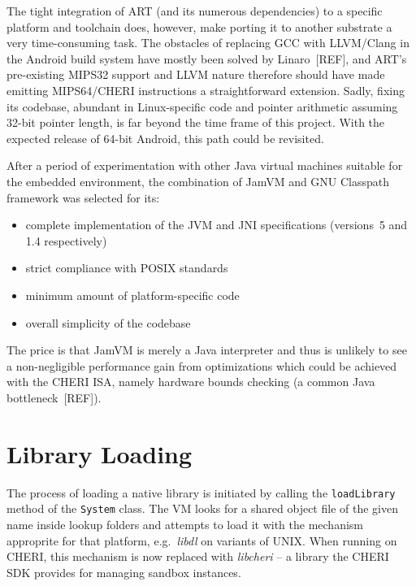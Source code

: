 \documentclass[a4paper,12pt,twoside,openright]{report}
\newcommand{\class}[1]{\texttt{#1}}
\newcommand{\tool}[1]{\emph{#1}}
\newcommand{\lib}[1]{\tool{lib#1}}
\begin{document}
The tight integration of ART (and its numerous dependencies) to a specific platform and toolchain does, however, make porting it to another substrate a very time-consuming task. The obstacles of replacing GCC with LLVM{\slash}Clang in the Android build system have mostly been solved by Linaro~[REF], and ART's pre-existing MIPS32 support and LLVM nature therefore should have made emitting MIPS64/CHERI instructions a straightforward extension. Sadly, fixing its codebase, abundant in Linux-specific code and pointer arithmetic assuming 32-bit pointer length, is far beyond the time frame of this project. With the expected release of 64-bit Android, this path could be revisited.

After a period of experimentation with other Java virtual machines suitable for the embedded environment, the combination of JamVM and GNU Classpath framework was selected for its:
\begin{itemize}
\item complete implementation of the JVM and JNI specifications (versions~5 and 1.4 respectively)
\item strict compliance with POSIX standards
\item minimum amount of platform-specific code
\item overall simplicity of the codebase
\end{itemize}
The price is that JamVM is merely a Java interpreter and thus is unlikely to see a non-negligible performance gain from optimizations which could be achieved with the CHERI ISA, namely hardware bounds checking (a common Java bottleneck~[REF]).

\section{Library Loading}

The process of loading a native library is initiated by calling the \texttt{loadLibrary} method of the \class{System} class. The VM looks for a shared object file of the given name inside lookup folders and attempts to load it with the mechanism approprite for that platform, e.g.\ \lib{dl} on variants of UNIX. When running on CHERI, this mechanism is now replaced with \lib{cheri} -- a library the CHERI SDK provides for managing sandbox instances. 
\end{document}
